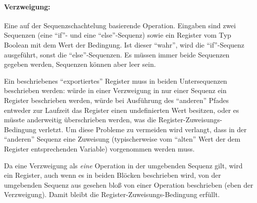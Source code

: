 \documentclass[twoside,a4paper,fleqn,12pt]{book}
\begin{document}

\paragraph{Verzweigung:} Eine auf der Sequenzschachtelung basierende Operation. Eingaben sind zwei Sequenzen (eine ``if''- und eine ``else''-Sequenz) sowie ein Register vom
Typ Boolean mit dem Wert der Bedingung. Ist dieser "`wahr"', wird die ``if''-Sequenz ausgeführt, sonst die ``else''-Sequenzen. Es müssen immer beide Sequenzen
gegeben werden, Sequenzen können aber leer sein.

Ein beschriebenes "`exportiertes"' Register muss in beiden Untersequenzen beschrieben werden: würde in einer Verzweigung
in nur einer Sequenz ein Register beschrieben werden, würde bei Ausführung des "`anderen"' Pfades entweder zur Laufzeit das Register einen undefinierten Wert besitzen, oder
es müsste anderweitig überschrieben werden, was die Register-Zuweisungs-Bedingung verletzt. Um diese Probleme zu vermeiden wird verlangt,
dass in der "`anderen"' Sequenz eine Zuweisung (typischerweise vom "`alten"' Wert der dem Register entsprechenden Variable) vorgenommen werden muss.

Da eine Verzweigung als \emph{eine} Operation in der umgebenden Sequenz gilt, wird ein Register, auch wenn es in beiden Blöcken beschrieben wird, 
von der umgebenden Sequenz aus gesehen bloß von einer Operation beschrieben (eben der Verzweigung). Damit bleibt die Register-Zuweisungs-Bedingung erfüllt.


\end{document}
